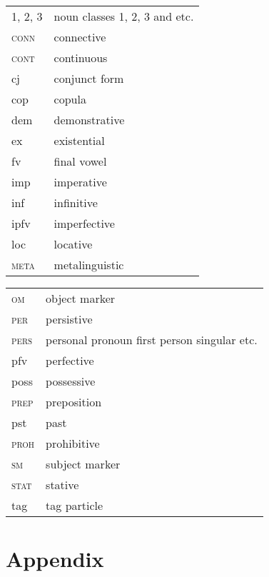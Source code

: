 \documentclass[output=paper]{langscibook}
\begin{document}
\noindent%
\begin{minipage}{\textwidth}
    \begin{tabularx}{.5\textwidth}[t]{@{} l Q }
1, 2, 3 & noun classes 1, 2, 3 and etc.\\ 
\textsc{conn}   & connective\\
\textsc{cont} & continuous\\
{\sc cj}&	conjunct form\\
{\sc cop}&	copula\\
{\sc dem}&	demonstrative\\
{\sc ex}&	existential\\
{\sc fv}&	final vowel\\
{\sc imp}&	imperative\\
{\sc inf}&	infinitive\\
{\sc ipfv}&	imperfective\\
{\sc loc}&	locative\\
\textsc{meta} & metalinguistic\\ 
\end{tabularx}
\begin{tabularx}{.5\textwidth}[t]{ l Q @{}}
\textsc{om}&object marker\\
\textsc{per}    &persistive\\
\textsc{pers}   &personal pronoun first person singular etc.\\
{\sc pfv}&	perfective\\
{\sc poss}&	possessive\\
\textsc{prep}&	preposition\\
{\sc pst}&	past\\
\textsc{proh}&		prohibitive\\
\textsc{sm}&	subject marker\\
\textsc{stat}   &stative\\
{\sc tag}&	tag particle\\
\end{tabularx}
\end{minipage}

\section*{Appendix}
\end{document}
